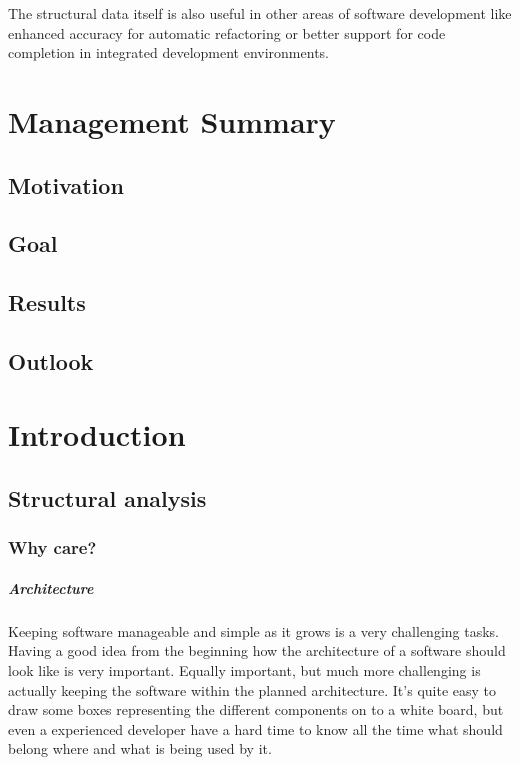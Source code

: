 \documentclass[12pt,halfparskip,DIV11,BCOR10mm]{scrreprt}
\begin{document}
The structural data itself is also useful in other areas of software development like enhanced accuracy for automatic refactoring or better support for code completion in integrated development environments.



\chapter*{Management Summary}

\section*{Motivation}

\section*{Goal}

\section*{Results}

\section*{Outlook}


\newpage

\tableofcontents

\newpage
{}
\pagestyle{scrheadings}

\chapter{Introduction}

\section{Structural analysis}

\subsection{Why care?}

\paragraph{Architecture}
Keeping software manageable and simple as it grows is a very challenging tasks. Having a good idea from the beginning how the architecture of a software should look like is very important. Equally important, but much more challenging is actually keeping the software within the planned architecture. It's quite easy to draw some boxes representing the different components on to a white board, but even a experienced developer have a hard time to know all the time what should belong where and what is being used by it.
\end{document}
